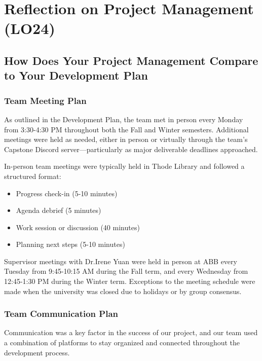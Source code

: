 \documentclass{article}
\begin{document}
\section{Reflection on Project Management (LO24)}


\subsection{How Does Your Project Management Compare to Your Development Plan}

\subsubsection{Team Meeting Plan}

As outlined in the Development Plan, the team met in person every Monday from 3:30-4:30 PM throughout both the Fall and Winter semesters. Additional meetings were held as needed, either in person or virtually through the team's Capstone Discord server—particularly as major deliverable deadlines approached.

In-person team meetings were typically held in Thode Library and followed a structured format:
\begin{itemize}
    \item Progress check-in (5-10 minutes)
    \item Agenda debrief (5 minutes)
    \item Work session or discussion (40 minutes)
    \item Planning next steps (5-10 minutes)
\end{itemize}
Supervisor meetings with Dr.Irene Yuan were held in person at ABB every Tuesday from 9:45-10:15 AM during the Fall term, and every Wednesday from 12:45-1:30 PM during the Winter term. Exceptions to the meeting schedule were made when the university was closed due to holidays or by group consensus.

\subsubsection{Team Communication Plan}

Communication was a key factor in the success of our project, and our team used a combination of platforms to stay organized and connected throughout the development process.
\end{document}
